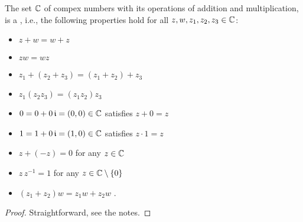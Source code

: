 \begin{theorem}
  \label{thm:complex_number_field}

  The set $\mathbb{C}$ of compex numbers with its operations of addition and multiplication,
  is a , i.e., the following properties hold for
  all $z, w, z_1, z_2, z_3 \in \mathbb{C}$:
  \begin{itemize}
    \item $z + w = w + z$ 
    \item $z w = w z$ 
    \item $z_1 + (z_2 + z_3) = (z_1 + z_2) + z_3$ 
    \item $z_1 (z_2 z_3) = (z_1 z_2) z_3$ 
    \item $0 = 0 + 0 \, \mathfrak{i} = (0,0) \in \mathbb{C}$ satisfies $z + 0 = z$
    \item $1 = 1 + 0 \, \mathfrak{i} = (1,0) \in \mathbb{C}$ satisfies $z \cdot 1= z$
    \item %
          $z + (-z) = 0$ for any $z \in \mathbb{C}$ 
    \item %
          $z \, z^{-1} = 1$ for any $z \in \mathbb{C} \setminus \left\{ 0 \right\}$ 
    \item $(z_1 + z_2) w = z_1 w + z_2 w$ .
  \end{itemize}
\end{theorem}
\begin{proof}
  Straightforward, see the notes.
\end{proof}
